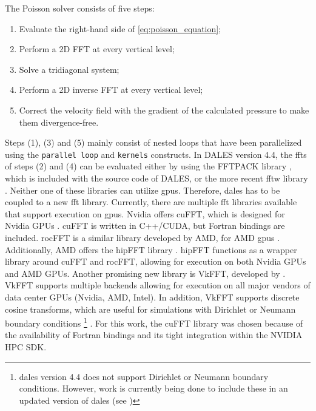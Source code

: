The Poisson solver consists of five steps:

\begin{enumerate}
  \item Evaluate the right-hand side of \autoref{eq:poisson_equation};
  \item Perform a 2D FFT at every vertical level;
  \item Solve a tridiagonal system;
  \item Perform a 2D inverse FFT at every vertical level;
  \item Correct the velocity field with the gradient of the calculated pressure to make them divergence-free.
\end{enumerate}

Steps (1), (3) and (5) mainly consist of nested loops that have been parallelized using the \texttt{parallel loop} and \texttt{kernels} constructs. In DALES version 4.4, the \acrshort{fft}s of steps (2) and (4) can be evaluated either by using the FFTPACK library \citep{swarztrauberVectorizingFFTs1982}, which is included with the source code of DALES, or the more recent \acrfull{fftw} library \citep{frigoFFTWAdaptiveSoftware1998a}. Neither one of these libraries can utilize \acrshort{gpu}s. Therefore, \acrshort{dales} has to be coupled to a new \acrshort{fft} library. Currently, there are multiple \acrshort{fft} libraries available that support execution on \acrshort{gpu}s. Nvidia offers cuFFT, which is designed for Nvidia GPUs \citep{nvidiaCuFFT}. cuFFT is written in C++/CUDA, but Fortran bindings are included. rocFFT is a similar library developed by AMD, for AMD \acrshort{gpu}s \citep{amdRocFFT2023}. Additionally, AMD offers the hipFFT library \citep{amdHipFFT2023}. hipFFT functions as a wrapper library around cuFFT and rocFFT, allowing for execution on both Nvidia GPUs and AMD GPUs. Another promising new library is VkFFT, developed by \citet{tolmachevVkFFTAPerformantCrossPlatform2023}. VkFFT supports multiple backends allowing for execution on all major vendors of data center GPUs (Nvidia, AMD, Intel). In addition, VkFFT supports discrete cosine transforms, which are useful for simulations with Dirichlet or Neumann boundary conditions \footnote{\acrshort{dales} version 4.4 does not support Dirichlet or Neumann boundary conditions. However, work is currently being done to include these in an updated version of \acrshort{dales} (see \citet{liquilungOpenBoundaryConditions2023})} \citep{schumannFastFourierTransforms1988}. For this work, the cuFFT library was chosen because of the availability of Fortran bindings and its tight integration within the NVIDIA HPC SDK.

